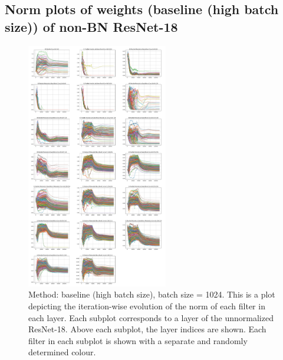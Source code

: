 \documentclass[times,sort&compress]{elsarticle}
\begin{document}
\subsection{Norm plots of weights (baseline (high batch size)) of non-BN ResNet-18}
\begin{figure}[ht] \centering
\includegraphics[width=0.55\textwidth]{baseline_high_bs-w_norm} \caption{ Method:
baseline (high batch size), batch size = 1024. This is a plot depicting the
iteration-wise evolution of the norm of each filter in each layer. Each subplot
corresponds to a layer of the unnormalized ResNet-18. Above each subplot, the layer
indices are shown. Each filter in each subplot is shown with a separate and randomly
determined colour. } \end{figure}

\clearpage
\end{document}

